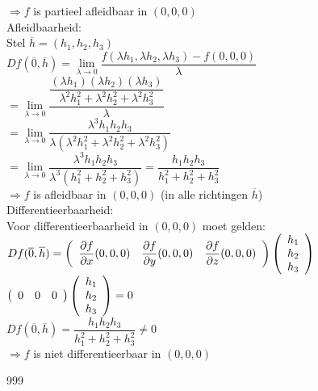 \documentclass[a4paper]{article}
\newcommand{\dlim}{\lim\limits}
\begin{document}
$\Rightarrow f$ is partieel afleidbaar in $(0,0,0)$\\

Afleidbaarheid:\\

Stel $\overline{h} = (h_1,h_2,h_3)$\\

$Df(\overline{0}, \overline{h}) = \dlim_{\lambda \rightarrow 0} \dfrac{f(\lambda h_1, \lambda h_2, \lambda h_3) - f(0,0,0)}{\lambda}$\\

$= \dlim_{\lambda \rightarrow 0} \dfrac{\dfrac{(\lambda h_1)(\lambda h_2)(\lambda h_3)}{\lambda^2 h_1^2 + \lambda^2 h_2^2 + \lambda^2 h_3^2}}{\lambda}$\\

$= \dlim_{\lambda \rightarrow 0} \dfrac{\lambda^3 h_1 h_2 h_3}{\lambda (\lambda^2 h_1^2 + \lambda^2 h_2^2 + \lambda^2 h_3^2)}$\\

$= \dlim_{\lambda \rightarrow 0} \dfrac{\lambda^3 h_1 h_2 h_3}{\lambda^3 (h_1^2 + h_2^2 + h_3^2)} = \dfrac{h_1 h_2 h_3}{h_1^2 + h_2^2 + h_3^2}$\\

$\Rightarrow f$ is afleidbaar in $(0,0,0)$ (in alle richtingen $\overline{h}$)\\

Differentieerbaarheid:\\

Voor differentieerbaarheid in $(0,0,0)$ moet gelden:\\

$Df(\overline{0}, \overline{h}) = \left(\begin{array}{c c c} \dfrac{\partial f}{\partial x}(0,0,0) & \dfrac{\partial f}{\partial y}(0,0,0) & \dfrac{\partial f}{\partial z}(0,0,0) \end{array}\right) \left(\begin{array}{c} h_1 \\ h_2 \\ h_3 \end{array}\right)$\\

$\left(\begin{array}{c c c} 0 & 0 & 0 \end{array}\right) \left(\begin{array}{c} h_1 \\ h_2 \\ h_3 \end{array}\right) = 0$\\

$Df(\overline{0}, \overline{h}) = \dfrac{h_1 h_2 h_3}{h_1^2 + h_2^2 + h_3^2} \neq 0$\\

$\Rightarrow f$ is niet differentieerbaar in $(0,0,0)$\\

\begin{thebibliography}{999}
\end{thebibliography}
\end{document}
